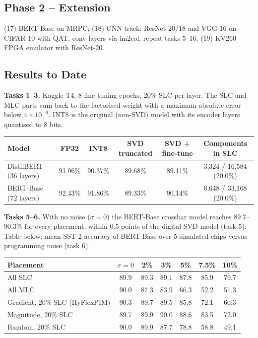 \documentclass[10pt,a4paper]{article}
\begin{document}
\subsection{Phase 2 -- Extension}
(17) BERT-Base on MRPC; (18) CNN track: ResNet-20/18 and VGG-16 on CIFAR-10 with QAT, conv layers via
im2col, repeat tasks 5--16; (19) KV260 FPGA emulator with ResNet-20.

\subsection{Results to Date}
\textbf{Tasks 1--3.} Kaggle T4, 8 fine-tuning epochs, 20\% SLC per layer. The SLC and MLC parts sum back
to the factorised weight with a maximum absolute error below $4\times10^{-6}$. INT8 is the original
(non-SVD) model with its encoder layers quantised to 8 bits.

\begin{table}[h]
\centering\small
\begin{tabular}{@{}lccccc@{}}
\toprule
Model & FP32 & INT8 & SVD truncated & SVD + fine-tune & Components in SLC \\
\midrule
DistilBERT (36 layers) & 91.06\% & 90.37\% & 89.68\% & 89.11\% & 3{,}324 / 16{,}584 (20.0\%) \\
BERT-Base (72 layers) & 92.43\% & 91.86\% & 89.33\% & 90.14\% & 6{,}648 / 33{,}168 (20.0\%) \\
\bottomrule
\end{tabular}
\end{table}

\noindent\textbf{Tasks 5--6.} With no noise ($\sigma=0$) the BERT-Base crossbar model reaches
89.7--90.3\% for every placement, within 0.5 points of the digital SVD model (task 5). Table below:
mean SST-2 accuracy of BERT-Base over 5 simulated chips versus programming noise (task 6).

\begin{table}[h]
\centering\small
\begin{tabular}{@{}lcccccc@{}}
\toprule
Placement & $\sigma=0$ & 2\% & 3\% & 5\% & 7.5\% & 10\% \\
\midrule
All SLC & 89.9 & 89.3 & 89.1 & 87.8 & 85.9 & 79.7 \\
All MLC & 90.0 & 87.3 & 83.9 & 66.3 & 52.2 & 51.3 \\
Gradient, 20\% SLC (HyFlexPIM) & 90.3 & 89.7 & 89.5 & 85.8 & 72.1 & 60.3 \\
Magnitude, 20\% SLC & 89.7 & 89.9 & 90.0 & 88.6 & 83.5 & 72.0 \\
Random, 20\% SLC & 90.0 & 89.9 & 87.7 & 78.8 & 58.8 & 49.1 \\
\bottomrule
\end{tabular}
\end{table}
\end{document}
